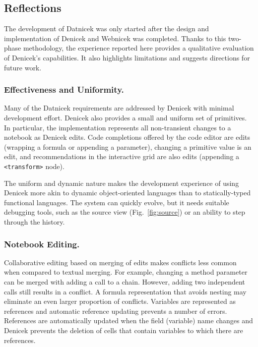 \documentclass[sigconf,anonymous,screen]{acmart}
\begin{document}
\subsection{Reflections}
\label{sec:case-reflection}

The development of Datnicek was only started after the design and implementation of Denicek and
Webnicek was completed. Thanks to this two-phase methodology, the experience reported here
provides a qualitative evaluation of Denicek's capabilities. It also highlights limitations and
suggests directions for future work.

\subsubsection*{Effectiveness and Uniformity.}
Many of the Datnicek requirements are addressed by Denicek with minimal development
effort. Denicek also provides a small and uniform set of primitives. In particular,
the implementation represents all non-transient changes to a notebook as Denicek edits.
Code completions offered by the code editor are edits (wrapping a formula or appending a parameter),
changing a primitive value is an edit, and recommendations in the interactive grid are also edits
(appending a {\small\Verb_<transform>_} node).

The uniform and dynamic nature makes the development experience of using Denicek more akin to dynamic
object-oriented languages than to statically-typed functional languages. The system can quickly evolve,
but it needs suitable debugging tools, such as the source view (Fig.~\ref{fig:source}) or an
ability to step through the history.


\subsubsection*{Notebook Editing.}
Collaborative editing based on merging of edits makes conflicts less common when compared to
textual merging. For example, changing a method parameter can be merged with adding a call
to a chain. However, adding two independent calls still results in a conflict. A formula
representation that avoids nesting \cite{petricek-2019-histogram} may eliminate an even larger
proportion of conflicts.
%
Variables are represented as references and automatic reference updating %
prevents a number of errors. References are automatically updated when the field (variable) name changes
and Denicek prevents the deletion of cells that contain variables to which there are references.
\end{document}
